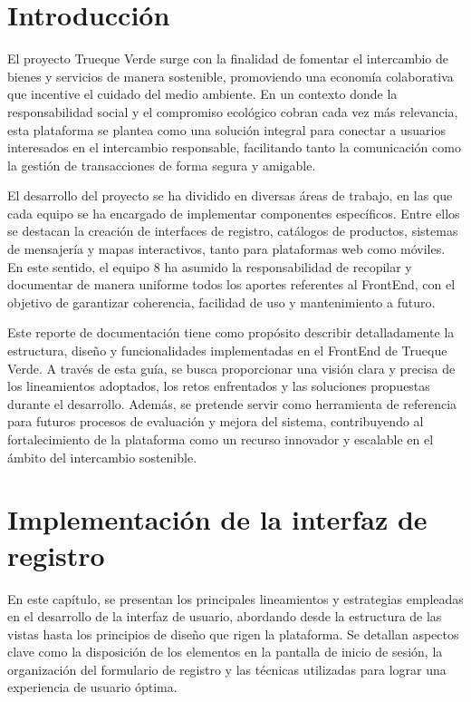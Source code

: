 \documentclass[11pt, a4paper, oneside]{book}
\begin{document}


\renewcommand{\contentsname}{Índice} 
\tableofcontents
\newpage
\chapter{Introducción}

\noindent El proyecto Trueque Verde surge con la finalidad de fomentar el intercambio de bienes y servicios de manera sostenible, promoviendo una economía colaborativa que incentive el cuidado del medio ambiente. En un contexto donde la responsabilidad social y el compromiso ecológico cobran cada vez más relevancia, esta plataforma se plantea como una solución integral para conectar a usuarios interesados en el intercambio responsable, facilitando tanto la comunicación como la gestión de transacciones de forma segura y amigable.

El desarrollo del proyecto se ha dividido en diversas áreas de trabajo, en las que cada equipo se ha encargado de implementar componentes específicos. Entre ellos se destacan la creación de interfaces de registro, catálogos de productos, sistemas de mensajería y mapas interactivos, tanto para plataformas web como móviles. En este sentido, el equipo 8 ha asumido la responsabilidad de recopilar y documentar de manera uniforme todos los aportes referentes al FrontEnd, con el objetivo de garantizar coherencia, facilidad de uso y mantenimiento a futuro.

Este reporte de documentación tiene como propósito describir detalladamente la estructura, diseño y funcionalidades implementadas en el FrontEnd de Trueque Verde. A través de esta guía, se busca proporcionar una visión clara y precisa de los lineamientos adoptados, los retos enfrentados y las soluciones propuestas durante el desarrollo. Además, se pretende servir como herramienta de referencia para futuros procesos de evaluación y mejora del sistema, contribuyendo al fortalecimiento de la plataforma como un recurso innovador y escalable en el ámbito del intercambio sostenible.


\chapter{Implementación de la interfaz de registro}

En este capítulo, se presentan los principales lineamientos y estrategias empleadas en el desarrollo de la interfaz de usuario, abordando desde la estructura de las vistas hasta los principios de diseño que rigen la plataforma. Se detallan aspectos clave como la disposición de los elementos en la pantalla de inicio de sesión, la organización del formulario de registro y las técnicas utilizadas para lograr una experiencia de usuario óptima.
\end{document}

